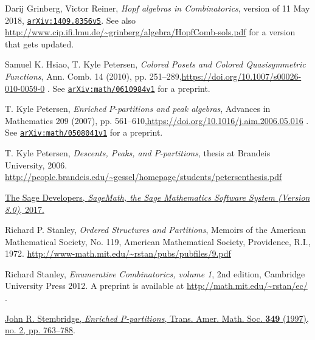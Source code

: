 \documentclass[numbers=enddot,12pt,final,onecolumn,notitlepage]{scrartcl}%
\theoremstyle{definition}
\begin{document}
\begin{thebibliography}{99999999}
Darij Grinberg, Victor Reiner, \textit{Hopf
algebras in Combinatorics}, version of 11 May 2018,
\texttt{\href{http://www.arxiv.org/abs/1409.8356v5}{arXiv:1409.8356v5}}.
\newline See also
\url{http://www.cip.ifi.lmu.de/~grinberg/algebra/HopfComb-sols.pdf} for a
version that gets updated.

Samuel K. Hsiao, T. Kyle Petersen, \textit{Colored
Posets and Colored Quasisymmetric Functions}, Ann. Comb. 14 (2010), pp.
251--289,\newline\url{https://doi.org/10.1007/s00026-010-0059-0} . See
\href{http://www.arxiv.org/abs/math/0610984v1}{\texttt{arXiv:math/0610984v1}}
for a preprint.

T. Kyle Petersen, \textit{Enriched }$\mathit{P}%
$\textit{-partitions and peak algebras}, Advances in Mathematics 209 (2007),
pp. 561--610,\newline\url{https://doi.org/10.1016/j.aim.2006.05.016} . See
\texttt{\href{https://arxiv.org/abs/math/0508041v1}{arXiv:math/0508041v1}} for
a preprint.

T. Kyle Petersen,
\textit{Descents, Peaks, and $P$-partitions},
thesis at Brandeis University,
2006.
\url{http://people.brandeis.edu/~gessel/homepage/students/petersenthesis.pdf}

\href{http://www.sagemath.org}{The Sage
Developers, \textit{SageMath, the Sage Mathematics Software System (Version
8.0)}, 2017.}

Richard P. Stanley, \textit{Ordered Structures and
Partitions}, Memoirs of the American Mathematical Society, No. 119, American
Mathematical Society, Providence, R.I., 1972. \newline\url{http://www-math.mit.edu/~rstan/pubs/pubfiles/9.pdf}

Richard Stanley, \textit{Enumerative
Combinatorics, volume 1}, 2nd edition, Cambridge University Press 2012. A
preprint is available at \url{http://math.mit.edu/~rstan/ec/} .

%
\href{http://www.ams.org/journals/tran/1997-349-02/S0002-9947-97-01804-7/}{John
R. Stembridge, \textit{Enriched P-partitions}, Trans. Amer. Math. Soc.
\textbf{349} (1997), no. 2, pp. 763--788}.
\end{thebibliography}
\end{document}
